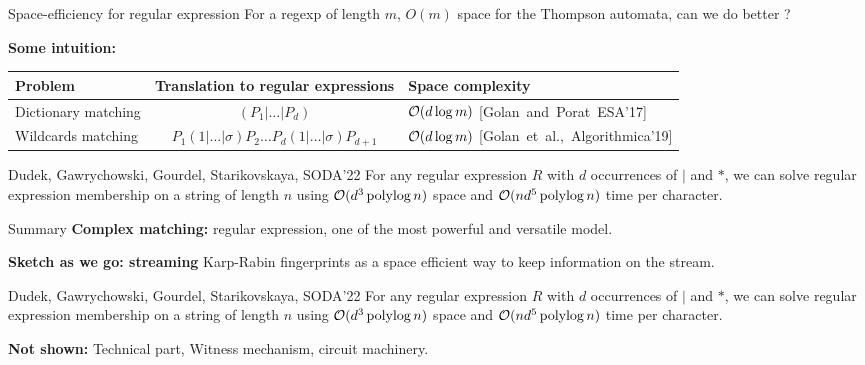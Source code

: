 {\renewcommand{\arraystretch}{2}
\begin{frame}{Space-efficiency for regular expression}
    For a regexp of length $m$, $O(m)$ space for the Thompson automata, can we do better ? \pause

    \medskip
    \textbf{Some intuition:}  \pause

    \medskip
    \begin{tabular}{l c p{}}
        Problem & Translation to regular expressions & Space complexity\\ 
        \hline \pause
        Dictionary matching & $(P_{1}|\ldots | P_{d})$ & $\mathcal{O}(d\log m)$  \mbox{\footnotesize [Golan~and~Porat~ESA'17]}\\ \pause
        Wildcards matching & $P_{1}(1|\ldots|\sigma)P_{2}\ldots P_{d}(1|\ldots|\sigma)P_{d+1}$ & $\mathcal{O}(d\log m)$ \mbox{\footnotesize [Golan et al.,~Algorithmica'19]} \pause
    \end{tabular}

    \medskip
    \begin{myalertblock}{Dudek, Gawrychowski, Gourdel, Starikovskaya, SODA'22}
        For any regular expression $R$ with $d$ occurrences of $|$ and $\ast$, we can solve regular expression membership on a string of length $n$ using $\mathcal{O}(d^{3}\operatorname{polylog} n)$ space and $\mathcal{O}(nd^{5}\operatorname{polylog} n)$ time per character.
    \end{myalertblock}
\end{frame}
}

\begin{frame}{Summary}
    \textbf{Complex matching:} regular expression, one of the most powerful and versatile model.

    \vfill
    
    \textbf{Sketch as we go: streaming} Karp-Rabin fingerprints as a space efficient way to keep information on the stream.

    \begin{myalertblock}{Dudek, Gawrychowski, Gourdel, Starikovskaya, SODA'22}
        For any regular expression $R$ with $d$ occurrences of $|$ and $\ast$, we can solve regular expression membership on a string of length $n$ using $\mathcal{O}(d^{3}\operatorname{polylog} n)$ space and $\mathcal{O}(nd^{5}\operatorname{polylog} n)$ time per character.
    \end{myalertblock}
    \vfill
    \textbf{Not shown:} Technical part, Witness mechanism, circuit machinery.
\end{frame}